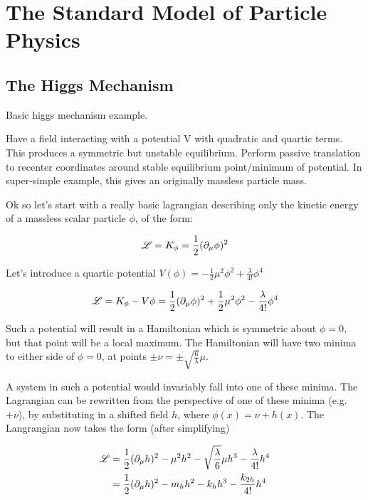 \section{The Standard Model of Particle Physics}
    \subsection{The Higgs Mechanism}

        Basic higgs mechanism example.

        Have a field interacting with a potential V with quadratic and quartic terms.
        This produces a symmetric but unstable equilibrium.
        Perform passive translation to recenter coordinates around stable equilibrium point/minimum of potential.
        In super-simple example, this gives an originally massless particle mass.

        Ok so let's start with a really basic lagrangian describing only the kinetic energy of a massless scalar particle $\phi$, of the form:

        \begin{equation}
            \mathscr{L} = K_{\phi} = \frac{1}{2} (\partial_{\mu} \phi)^2
        \end{equation}

        Let's introduce a quartic potential $V(\phi) = -\frac{1}{2} \mu^2 \phi^2 + \frac{\lambda}{4!} \phi^4$

        \begin{equation}
            \mathscr{L} = K_{\phi} - V{\phi} = \frac{1}{2} (\partial_{\mu} \phi)^2 
                +\frac{1}{2} \mu^2 \phi^2 - \frac{\lambda}{4!} \phi^4
        \end{equation}

        Such a potential will result in a Hamiltonian which is symmetric about $\phi=0$, but that point will be a local maximum.%
        The Hamiltonian will have two minima to either side of $\phi=0$, at points $\pm \nu = \pm \sqrt{\frac{6}{\lambda}} \mu$.

        A system in such a potential would invariably fall into one of these minima.
        The Lagrangian can be rewritten from the perspective of one of these minima (e.g.\ $+\nu$),
            by substituting in a shifted field $h$, where $\phi(x)=\nu+h(x)$.
        The Langrangian now takes the form (after simplifying)

        \begin{equation} \begin{split} \label{eq:basic_higgs}
            \mathscr{L} & = \frac{1}{2} (\partial_{\mu} h)^2
                - \mu^2 h^2
                -\sqrt{\frac{\lambda}{6}} \mu h^3
                - \frac{\lambda}{4!} h^4 \\
             & = \frac{1}{2} (\partial_{\mu} h)^2
                - m_{h} h^2
                - k_{h} h^3
                - \frac{k_{2h}}{4!} h^4
        \end{split} \end{equation}


